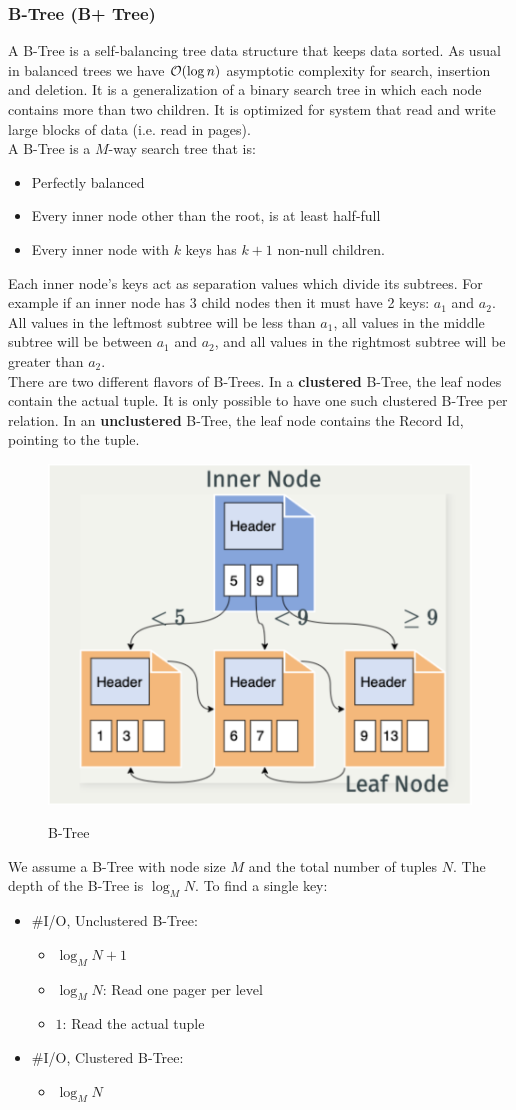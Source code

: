 \subsubsection{B-Tree (B+ Tree)}
A B-Tree is a self-balancing tree data structure that keeps data sorted. As usual in balanced trees we have $\mathcal{O} (\log n)$ asymptotic complexity for search, insertion and deletion. It is a generalization of a binary search tree in which each node contains more than two children. It is optimized for system that read and write large blocks of data (i.e. read in pages).\\
A B-Tree is a $M$-way search tree that is:
\begin{itemize}
\item Perfectly balanced
\item Every inner node other than the root, is at least half-full
\item Every inner node with $k$ keys has $k+1$ non-null children.
\end{itemize}
Each inner node's keys act as separation values which divide its subtrees. For example if an inner node has 3 child nodes then it must have 2 keys: $a_1$ and $a_2$. All values in the leftmost subtree will be less than $a_1$, all values in the middle subtree will be between $a_1$ and $a_2$, and all values in the rightmost subtree will be greater than $a_2$.\\
There are two different flavors of B-Trees. In a \textbf{clustered} B-Tree, the leaf nodes contain the actual tuple. It is only possible to have one such clustered B-Tree per relation. In an \textbf{unclustered} B-Tree, the leaf node contains the Record Id, pointing to the tuple.
\begin{figure}[H]
\centering
\includegraphics[width=.5\textwidth]{images/btree.PNG}
\label{btree}
\caption{B-Tree}
\end{figure}
We assume a B-Tree with node size $M$ and the total number of tuples $N$. The depth of the B-Tree is $\log_M N$. To find a single key:
\begin{itemize}
\item \#I/O, Unclustered B-Tree:
\begin{itemize}
\item $\log_M N + 1$
\item $\log_M N$: Read one pager per level
\item $1$: Read the actual tuple
\end{itemize}
\item \#I/O, Clustered B-Tree:
\begin{itemize}
\item $\log_M N$
\end{itemize}
\end{itemize}

